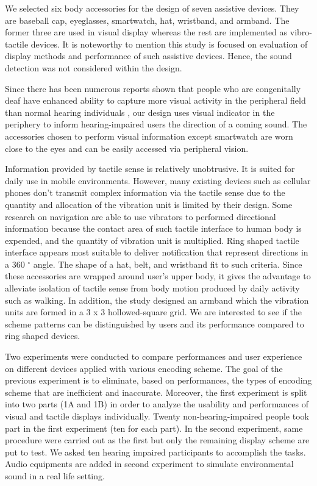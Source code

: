 \documentclass{sigchi}
\begin{document}
We selected six body accessories for the design of seven assistive devices. They are baseball cap, eyeglasses, smartwatch, hat, wristband, and armband. The former three are used in visual display whereas the rest are implemented as vibro-tactile devices. It is noteworthy to mention this study is focused on evaluation of display methods and performance of such assistive devices. Hence, the sound detection was not considered within the design.

Since there has been numerous reports shown that people who are congenitally deaf have enhanced ability to capture more visual activity in the peripheral field than normal hearing individuals \cite{Bavelier2000,Dye2009, Codina2011a}, our design uses visual indicator in the periphery to inform hearing-impaired users the direction of a coming sound. The accessories chosen to perform visual information except smartwatch are worn close to the eyes and can be easily accessed via peripheral vision.

Information provided by tactile sense is relatively unobtrusive. It is suited for daily use in mobile environments. However, many existing devices such as cellular phones don't transmit complex information via the tactile sense due to the quantity and allocation of the vibration unit is limited by their design. Some research on navigation are able to use vibrators to performed directional information because the contact area of such tactile interface to human body is expended, and the quantity of vibration unit is multiplied. Ring shaped tactile interface appears most suitable to deliver notification that represent directions in a 360 $^\circ$ angle. The shape of a hat, belt, and wristband fit to such criteria. Since these accessories are wrapped around user's upper body, it gives the advantage to alleviate isolation of tactile sense from body motion produced by daily activity such as walking. In addition, the study designed an armband which the vibration units are formed in a 3 x 3 hollowed-square grid. We are interested to see if the scheme patterns can be distinguished by users and its performance compared to ring shaped devices.

Two experiments were conducted to compare performances and user experience on different devices applied with various encoding scheme. The goal of the previous experiment is to eliminate, based on performances, the types of encoding scheme that are inefficient and inaccurate. Moreover, the first experiment is split into two parts (1A and 1B) in order to analyze the usability and performances of visual and tactile displays individually. Twenty non-hearing-impaired people took part in the first experiment (ten for each part). In the second experiment, same procedure were carried out as the first but only the remaining display scheme are put to test. We asked ten hearing impaired participants to accomplish the tasks. Audio equipments are added in second experiment to simulate environmental sound in a real life setting.
\end{document}
